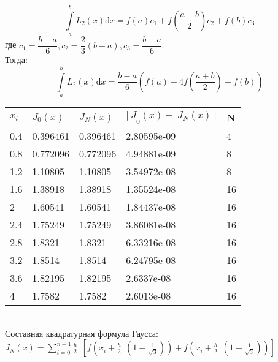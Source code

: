 \documentclass[12pt,a4paper]{report}
\begin{document}
{    \begin{equation}
    	\int\limits_{a}^{b}L_2(x)\mathrm{d}x = f(a)c_1 + f\left(\frac{a+b}{2}\right)c_2 + f(b)c_3
    \end{equation}
    где $c_1 = \dfrac{b-a}{6}, c_2 = \dfrac{2}{3}(b - a), c_3 = \dfrac{b-a}{6}.$\\
    \hfill\break
    Тогда:
    \begin{equation}
    	\int\limits_{a}^{b}L_2(x)\mathrm{d}x = \frac{b-a}{6}\left(f(a) + 4f\left(\frac{a+b}{2}\right)+f(b)\right)
    \end{equation}
	
	\begin{center}
		\begin{tabular}{ | l | l | l | l | l | }
			\hline
			$x_i$	& $J_0(x)$	& $J_N(x)$	& ${|\ J}_0\left(x\right)-\ J_N\left(x\right)\ |$	& N\\
			\hline
			0.4  	& 0.396461	& 0.396461	& 2.80595e-09	                                    & 4\\
			\hline
			0.8 	& 0.772096	& 0.772096	& 4.94881e-09	                                    & 8\\
			\hline
			1.2 	& 1.10805	& 1.10805	& 3.54972e-08	                                    & 8\\
			\hline
			1.6 	& 1.38918	& 1.38918	& 1.35524e-08	                                    & 16\\
			\hline
			2   	& 1.60541	& 1.60541	& 1.84437e-08	                                    & 16\\
			\hline
			2.4 	& 1.75249	& 1.75249	& 3.86081e-08	                                    & 16\\
			\hline
			2.8 	& 1.8321	& 1.8321	& 6.33216e-08	                                    & 16\\
			\hline
			3.2 	& 1.8514	& 1.8514	& 6.24795e-08	                                    & 16\\
			\hline
			3.6 	& 1.82195	& 1.82195	& 2.6337e-08	                                    & 16\\
			\hline
			4   	& 1.7582	& 1.7582	& 2.6013e-08	                                    & 16\\
			\hline
		\end{tabular}
	\end{center}
	
	\noindent \\Составная квадратурная формула Гаусса:
	\newline
	 $J_N\left(x\right)=\displaystyle\sum_{i=0}^{n-1}\frac{h}{2}\ \ \left [f\left(x_i+\frac{h}{2}\ \ (1-\frac{1}{\sqrt3})\right)+f\left(x_i+\frac{h}{2}\ \ (1+\frac{1}{\sqrt3})\right)\right]$\\
	
}
\end{document}
